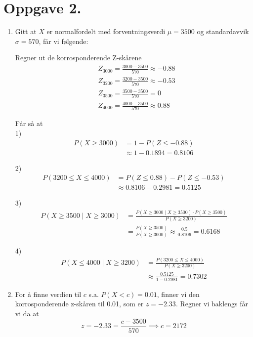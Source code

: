 \documentclass[a4paper,11pt,norsk]{article}
\begin{document}
\section*{Oppgave 2.}
\begin{enumerate}
    \item {
        Gitt at $X$ er normalfordelt med forventningsverdi $\mu = 3500$ 
        og standardavvik $\sigma = 570$, får vi følgende:

        Regner ut de korrosponderende Z-skårene
        \begin{align}
            &Z_{3000} = \frac{3000 - 3500}{570} \approx -0.88 \\
            &Z_{3200} = \frac{3200 - 3500}{570} \approx -0.53 \\
            &Z_{3500} = \frac{3500 - 3500}{570} = 0 \\
            &Z_{4000} = \frac{4000 - 3500}{570} \approx 0.88
        \end{align}

        Får så at \\
        1)
        \begin{align*}
            P(X \geq 3000) &= 1 - P(Z \leq -0.88) \\ 
                           &\approx 1-0.1894 = 0.8106
        \end{align*}

        2)
        \begin{align*}
            P(3200 \leq X \leq 4000) &= P(Z \leq 0.88) - P(Z \leq -0.53) \\ 
                                     &\approx 0.8106 - 0.2981 = 0.5125
        \end{align*}
        
        3)
        \begin{align*}
            P(X \geq 3500 \mid X \geq 3000) &= \frac{P(X \geq 3000 \mid X \geq 3500) \cdot P(X \geq 3500)}{P(X \geq 3200)} \\ 
                                            &= \frac{P(X \geq 3500)}{P(X \geq 3000)}
                                            \approx \frac{0.5}{0.8106} = 0.6168
        \end{align*}
        
        4)
        \begin{align*}
            P(X \leq 4000 \mid X \geq 3200) &= \frac{P(3200 \leq X \leq 4000)}{P(X \geq 3200)} \\ 
                                            &\approx \frac{0.5125}{1-0.2981} = 0.7302
        \end{align*}
    }
    \item {
        For å finne verdien til $c$ s.a. $P(X < c) = 0.01$, finner vi den korrosponderende 
        z-skåren til 0.01, som er $z = -2.33$. Regner vi baklengs får vi da at 
        \[
            z = -2.33 = \frac{c - 3500}{570} \implies c = 2172
        \]

}
\end{enumerate}
\end{document}
